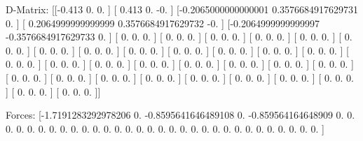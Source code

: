 D-Matrix:
[[-0.413               0.                  0.                ]
 [ 0.413               0.                 -0.                ]
 [-0.2065000000000001  0.3576684917629731  0.                ]
 [ 0.2064999999999999  0.3576684917629732 -0.                ]
 [-0.2064999999999997 -0.3576684917629733  0.                ]
 [ 0.                  0.                  0.                ]
 [ 0.                  0.                  0.                ]
 [ 0.                  0.                  0.                ]
 [ 0.                  0.                  0.                ]
 [ 0.                  0.                  0.                ]
 [ 0.                  0.                  0.                ]
 [ 0.                  0.                  0.                ]
 [ 0.                  0.                  0.                ]
 [ 0.                  0.                  0.                ]
 [ 0.                  0.                  0.                ]
 [ 0.                  0.                  0.                ]
 [ 0.                  0.                  0.                ]
 [ 0.                  0.                  0.                ]
 [ 0.                  0.                  0.                ]
 [ 0.                  0.                  0.                ]
 [ 0.                  0.                  0.                ]
 [ 0.                  0.                  0.                ]
 [ 0.                  0.                  0.                ]
 [ 0.                  0.                  0.                ]
 [ 0.                  0.                  0.                ]
 [ 0.                  0.                  0.                ]
 [ 0.                  0.                  0.                ]
 [ 0.                  0.                  0.                ]
 [ 0.                  0.                  0.                ]
 [ 0.                  0.                  0.                ]
 [ 0.                  0.                  0.                ]
 [ 0.                  0.                  0.                ]
 [ 0.                  0.                  0.                ]
 [ 0.                  0.                  0.                ]
 [ 0.                  0.                  0.                ]
 [ 0.                  0.                  0.                ]]

Forces:
[-1.7191283292978206  0.                 -0.8595641646489108
  0.                 -0.859564164648909   0.
  0.                  0.                  0.
  0.                  0.                  0.
  0.                  0.                  0.
  0.                  0.                  0.
  0.                  0.                  0.
  0.                  0.                  0.
  0.                  0.                  0.
  0.                  0.                  0.
  0.                  0.                  0.
  0.                  0.                  0.                ]

